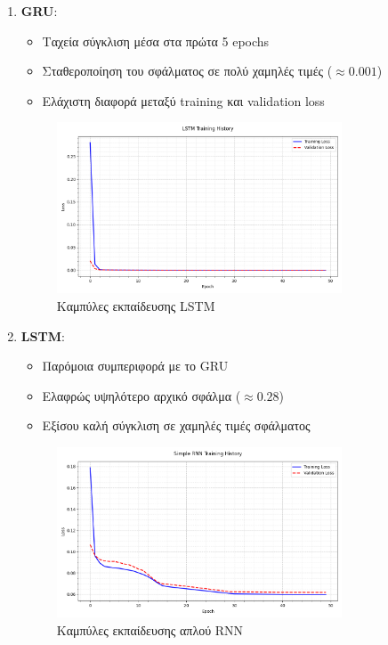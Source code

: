 \documentclass[a4paper,12pt]{article}
\begin{document}
\begin{enumerate}
   \item \textbf{GRU}:
   \begin{itemize}
       \item Ταχεία σύγκλιση μέσα στα πρώτα 5 epochs
       \item Σταθεροποίηση του σφάλματος σε πολύ χαμηλές τιμές ($\approx 0.001$)
       \item Ελάχιστη διαφορά μεταξύ training και validation loss
   \end{itemize}

\begin{figure}[h]
\centering
\includegraphics[width=0.8\textwidth]{lstm_loss.png}
\caption{Καμπύλες εκπαίδευσης LSTM}
\label{fig:lstm_history}
\end{figure}

   \item \textbf{LSTM}:
   \begin{itemize}
       \item Παρόμοια συμπεριφορά με το GRU
       \item Ελαφρώς υψηλότερο αρχικό σφάλμα ($\approx 0.28$)
       \item Εξίσου καλή σύγκλιση σε χαμηλές τιμές σφάλματος
   \end{itemize}

\begin{figure}[h]
\centering
\includegraphics[width=0.8\textwidth]{simple_rnn_loss.png}
\caption{Καμπύλες εκπαίδευσης απλού RNN}
\label{fig:rnn_history}
\end{figure}


\end{enumerate}
\end{document}
